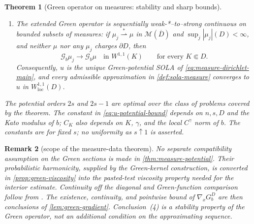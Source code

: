 \documentclass[10pt,a4paper]{amsart}
\numberwithin{equation}{section}
\newtheorem{theorem}{Theorem}[section]
\newtheorem{remark}[theorem]{Remark}
\newcommand{\M}{\mathcal M}
\newcommand{\rev}[1]{#1}
\begin{document}
\begin{theorem}[\rev{Green operator on measures: stability and sharp bounds}]
\begin{enumerate}
\item \rev{The extended Green operator is sequentially weak-*--to--strong
continuous on bounded subsets of measures: if
$\mu_j\stackrel{*}{\rightharpoonup}\mu$ in $\M(\overline D)$ and
$\sup_j|\mu_j|(D)<\infty$, and neither $\mu$ nor any $\mu_j$ charges
$\partial D$, then}
\begin{equation}\label{eq:green-measure-stability}
 \mathcal G_b\mu_j\longrightarrow\mathcal G_b\mu
 \quad\text{in }W^{1,1}(K)
 \qquad\text{for every }K\Subset D.
\end{equation}
\rev{Consequently, $u$ is the unique Green-potential SOLA of
\eqref{eq:measure-dirichlet-main}, and every admissible approximation in
\cref{def:sola-measure} converges to $u$ in
$W^{1,1}_{\mathrm{loc}}(D)$.}
\end{enumerate}
\rev{The potential orders $2s$ and $2s-1$ are optimal over the class of
problems covered by the theorem.  The constant in
\eqref{eq:u-potential-bound} depends on $n,s,D$ and the Kato modulus of
$b$; $C_K$ also depends on $K$, $\gamma$, and the local $C^\gamma$ norm of
$b$.}  The constants are for fixed $s$; no uniformity as $s\uparrow1$ is
asserted.
\endgroup
\end{theorem}


\begin{remark}[scope of the measure-data theorem]
\label{rem:measure-scope}
\rev{No separate compatibility assumption on the Green sections is made in
\cref{thm:measure-potential}.  Their probabilistic harmonicity, supplied by
the Green-kernel construction, is converted in
\cref{prop:green-viscosity} into the pasted-test viscosity property needed
for the interior estimate.  Continuity off the diagonal and Green-function
comparison follow from \cite[Lemma~7 and Theorem~1]{BogdanJakubowski2012}.
The existence, continuity, and pointwise bound of $\nabla_xG_b^D$ are then
conclusions of \cref{lem:green-gradient}.  Conclusion~(4) is a stability
property of the Green operator, not an additional condition on the
approximating sequence.}
\end{remark}
\end{document}
